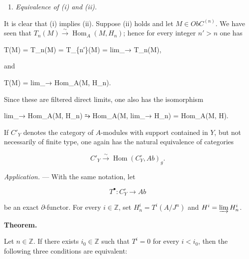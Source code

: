 \documentclass[
]{article}
\newenvironment{Shaded}{}{}
\newcommand{\NormalTok}[1]{#1}
\providecommand{\tightlist}{%
  \setlength{\itemsep}{0pt}\setlength{\parskip}{0pt}}
\begin{document}
\begin{enumerate}
\def\labelenumi{\alph{enumi})}
\setcounter{enumi}{1}
\tightlist
\item
  \emph{Equivalence of (i) and (ii).}
\end{enumerate}

It is clear that (i) implies (ii). Suppose (ii) holds and let
\(M \in Ob C^{(n)}\). We have seen that
\(T_{n}(M) \xrightarrow{\sim} \operatorname{Hom}_{A}(M, H_{n})\); hence
for every integer \(n' > n\) one has

\begin{Shaded}
\begin{Highlighting}[]
\NormalTok{T(M) = T\_n(M) = T\_\{n′\}(M) = lim\_→ T\_n(M),}
\end{Highlighting}
\end{Shaded}

and

\begin{Shaded}
\begin{Highlighting}[]
\NormalTok{T(M) = lim\_→ Hom\_A(M, H\_n).}
\end{Highlighting}
\end{Shaded}

Since these are filtered direct limits, one also has the isomorphism

\begin{Shaded}
\begin{Highlighting}[]
\NormalTok{lim\_→ Hom\_A(M, H\_n) ⥲ Hom\_A(M, lim\_→ H\_n) = Hom\_A(M, H).}
\end{Highlighting}
\end{Shaded}

If \(C'_{Y}\) denotes the category of \(A\)-modules with support
contained in \(Y\), but not necessarily of finite type, one again has
the natural equivalence of categories

\[
C'_{Y} \xrightarrow{\sim} \operatorname{Hom}(C^{\circ}_{Y}, Ab)_{g}.
\]

\emph{Application.} --- With the same notation, let

\[
T^{\bullet} : C^{\circ}_{Y} \longrightarrow Ab
\]

be an exact \(\partial\)-functor. For every \(i \in \mathbb{Z}\), set
\(H^{i}_{n} = T^{i}(A/J^{n})\) and \(H^{i} = \varinjlim H^{i}_{n}\).

\textbf{Theorem.}

Let \(n \in \mathbb{Z}\). If there exists \(i_{0} \in \mathbb{Z}\) such
that \(T^{i} = 0\) for every \(i < i_{0}\), then the following three
conditions are equivalent:
\end{document}
